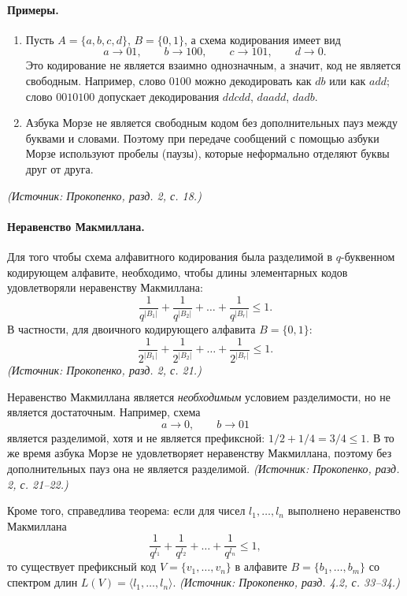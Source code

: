 \documentclass[a4paper,12pt]{article}
\begin{document}
\paragraph{Примеры.}
\begin{enumerate}[label=\arabic*)]
\item Пусть \(A=\{a,b,c,d\}\), \(B=\{0,1\}\), а схема кодирования имеет вид
\[
a\to 01,\qquad b\to 100,\qquad c\to 101,\qquad d\to 0.
\]
Это кодирование не является взаимно однозначным, а значит, код не является свободным. Например, слово \(0100\) можно декодировать как \(db\) или как \(add\); слово \(0010100\) допускает декодирования \(ddcdd\), \(daadd\), \(dadb\).
\item Азбука Морзе не является свободным кодом без дополнительных пауз между буквами и словами. Поэтому при передаче сообщений с помощью азбуки Морзе используют пробелы (паузы), которые неформально отделяют буквы друг от друга.
\end{enumerate}
\textit{(Источник: Прокопенко, разд. 2, с. 18.)}

\paragraph{Неравенство Макмиллана.}
Для того чтобы схема алфавитного кодирования была разделимой в \(q\)-буквенном кодирующем алфавите, необходимо, чтобы длины элементарных кодов удовлетворяли неравенству Макмиллана:
\[
\frac{1}{q^{|B_1|}}+\frac{1}{q^{|B_2|}}+\dots+\frac{1}{q^{|B_r|}}\le 1.
\]
В частности, для двоичного кодирующего алфавита \(B=\{0,1\}\):
\[
\frac{1}{2^{|B_1|}}+\frac{1}{2^{|B_2|}}+\dots+\frac{1}{2^{|B_r|}}\le 1.
\]
\textit{(Источник: Прокопенко, разд. 2, с. 21.)}

Неравенство Макмиллана является \emph{необходимым} условием разделимости, но не является достаточным. Например, схема
\[
a\to 0,\qquad b\to 01
\]
является разделимой, хотя и не является префиксной: \(1/2+1/4=3/4\le 1\). В то же время азбука Морзе не удовлетворяет неравенству Макмиллана, поэтому без дополнительных пауз она не является разделимой.
\textit{(Источник: Прокопенко, разд. 2, с. 21--22.)}

Кроме того, справедлива теорема: если для чисел \(l_1,\dots,l_n\) выполнено неравенство Макмиллана
\[
\frac{1}{q^{l_1}}+\frac{1}{q^{l_2}}+\dots+\frac{1}{q^{l_n}}\le 1,
\]
то существует префиксный код \(V=\{v_1,\dots,v_n\}\) в алфавите \(B=\{b_1,\dots,b_m\}\) со спектром длин \(L(V)=\langle l_1,\dots,l_n\rangle\).
\textit{(Источник: Прокопенко, разд. 4.2, с. 33--34.)}
\end{document}

